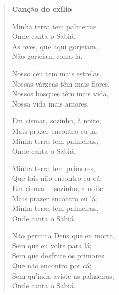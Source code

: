 \begin{minipage}{.5\textwidth}
\begin{verse}
\textbf{Canção do exílio}

Minha terra tem palmeiras\\
Onde canta o Sabiá,\\
As aves, que aqui gorjeiam,\\
Não gorjeiam como lá.

Nosso céu tem mais estrelas,\\
Nossas várzeas têm mais flores,\\
Nossos bosques têm mais vida,\\
Nossa vida mais amores.

Em cismar, sozinho, à noite,\\
Mais prazer encontro eu lá;\\
Minha terra tem palmeiras,\\
Onde canta o Sabiá.

Minha terra tem primores,\\
Que tais não encontro eu cá;\\
Em cismar – sozinho, à noite –\\
Mais prazer encontro eu lá;\\
Minha terra tem palmeiras,\\
Onde canta o Sabiá.

Não permita Deus que eu morra,\\
Sem que eu volte para lá;\\
Sem que desfrute os primores\\
Que não encontro por cá;\\
Sem qu'inda aviste as palmeiras,\\
Onde canta o Sabiá.

\end{verse}
\end{minipage}\hspace{1cm}
